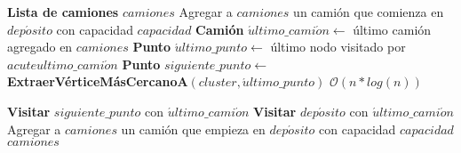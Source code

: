 \begin{algorithm}[H]
\caption{\Comment $\mathcal{O}(n^2*log(n))$}
\begin{algorithmic}[1]
	\State \textbf{Lista de camiones} $camiones$
	\State Agregar a $camiones$ un camión que comienza en $dep\acute{o}sito$ con capacidad $capacidad$
	\Statex
			\State \textbf{Camión} $\acute{u}ltimo\_cami\acute{o}n \gets$ último camión agregado en $camiones$
			\State \textbf{Punto} $\acute{u}ltimo\_punto \gets$ último nodo visitado por $acute{u}ltimo\_cami\acute{o}n$
			\Statex
			\State \textbf{Punto} $siguiente\_punto \gets$ 
			\Statex[5] \textbf{ExtraerVérticeMásCercanoA}$(cluster, \acute{u}ltimo\_punto)$
			\Comment $\mathcal{O}(n*log(n))$

			\State \textbf{Visitar} $siguiente\_punto$ con $\acute{u}ltimo\_cami\acute{o}n$
		\EndWhile
		\Statex
		\State \textbf{Visitar} $dep\acute{o}sito$ con $\acute{u}ltimo\_cami\acute{o}n$
		\State Agregar a $camiones$ un camión que empieza en $dep\acute{o}sito$ con capacidad $capacidad$
	\EndFor
	\Statex
	\State \Return $camiones$
\EndFunction
\end{algorithmic}
\end{algorithm}